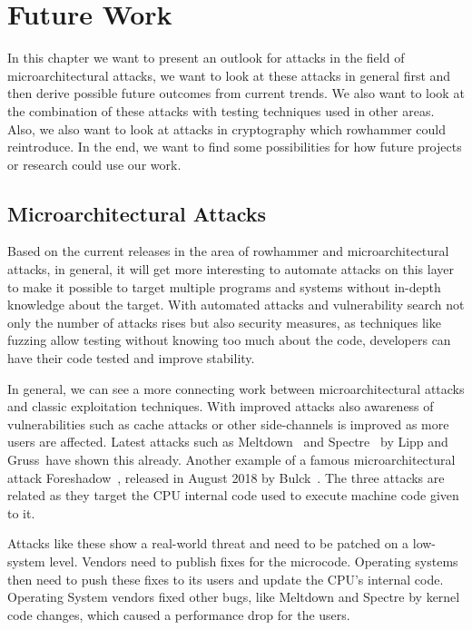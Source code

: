 \chapter{Future Work}\label{sec:futurework}

In this chapter we want to present an outlook for attacks in the field of
microarchitectural attacks, we want to look at these attacks in general first
and then derive possible future outcomes from current trends. We also want to
look at the combination of these attacks with testing techniques used in other
areas. Also, we also want to look at attacks in cryptography which rowhammer
could reintroduce. In the end, we want to find some possibilities for how future
projects or research could use our work.

\section{Microarchitectural Attacks}

Based on the current releases in the area of rowhammer and microarchitectural
attacks, in general, it will get more interesting to automate attacks on this
layer to make it possible to target multiple programs and systems without
in-depth knowledge about the target. With automated attacks and vulnerability
search not only the number of attacks rises but also security measures, as
techniques like fuzzing allow testing without knowing too much about the code,
developers can have their code tested and improve stability.

In general, we can see a more connecting work between microarchitectural attacks
and classic exploitation techniques. With improved attacks also awareness of
vulnerabilities such as cache attacks or other side-channels is improved as more
users are affected. Latest attacks such as Meltdown~\cite{meltdown} and
Spectre~\cite{spectre} by Lipp and Gruss~\etal have shown this already. Another
example of a famous microarchitectural attack Foreshadow~\cite{foreshadow},
released in August 2018 by Bulck~\etal. The three attacks are related as they
target the CPU internal code used to execute machine code given to it.

Attacks like these show a real-world threat and need to be patched on a
low-system level. Vendors need to publish fixes for the microcode. Operating
systems then need to push these fixes to its users and update the CPU's internal
code. Operating System vendors fixed other bugs, like Meltdown and Spectre by
kernel code changes, which caused a performance drop for the users.


